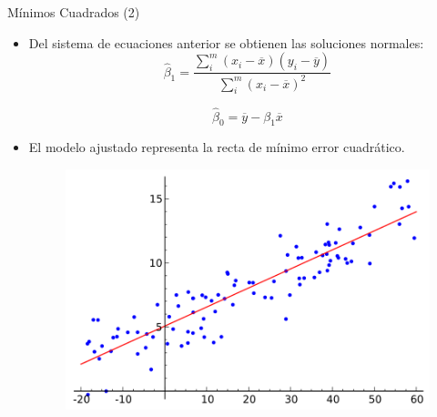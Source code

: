 \documentclass[handout]{beamer}
\begin{document}
\begin{frame}{Mínimos Cuadrados (2)}
\scriptsize{
\begin{itemize}
 \item Del sistema de ecuaciones anterior se obtienen las soluciones normales:
  \begin{equation}
 \hat{\beta}_{1} = \frac{\sum_{i}^{m} (x_i-\overline{x})(y_i-\overline{y}) }{ \sum_{i}^{m} (x_i-\overline{x})^2}    
 \end{equation}

 \begin{equation}
 \hat{\beta}_{0} = \overline{y} -\beta_{1}\overline{x}    
 \end{equation}



\item El modelo ajustado representa la recta de mínimo error cuadrático.

\begin{figure}[h!]
	\centering
	\includegraphics[scale=0.35]{imagenes/Linear_regression.png}
\end{figure}

\end{itemize}

} 
 
\end{frame}
\end{document}
